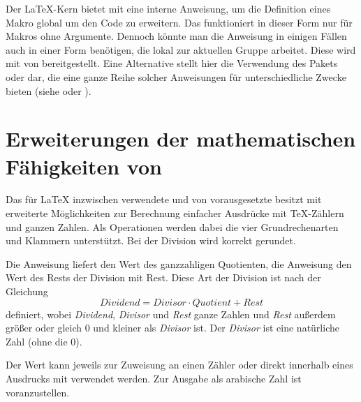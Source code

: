\begin{Declaration}
\end{Declaration}%
Der \LaTeX-Kern bietet mit  eine interne Anweisung, um
die Definition eines Makro  global um den Code
 zu erweitern. Das funktioniert in dieser Form nur für
Makros ohne Argumente. Dennoch könnte man die Anweisung in einigen Fällen
auch in einer Form benötigen, die lokal zur aktuellen Gruppe arbeitet. Diese
wird mit  von  bereitgestellt. Eine
Alternative stellt hier die Verwendung des Pakets
 oder
 dar, die eine ganze Reihe solcher
Anweisungen für unterschiedliche Zwecke bieten (siehe
\cite{package:etoolbox} oder \cite{package:xpatch}).
%
\EndIndexGroup


\section{Erweiterungen der mathematischen Fähigkeiten von \eTeX}

Das für \LaTeX{} inzwischen verwendete und von \KOMAScript{} vorausgesetzte
\eTeX{} besitzt mit  erweiterte Möglichkeiten
zur Berechnung einfacher Ausdrücke mit \TeX-Zählern und ganzen Zahlen. Als
Operationen werden dabei die vier Grundrechenarten und Klammern
unterstützt. Bei der Division wird korrekt gerundet.
\iffalse Manchmal sind weitere Operationen nützlich.\fi%

\begin{Declaration}
\end{Declaration}%
%
%
Die Anweisung  liefert den
Wert des ganzzahligen Quotienten, die Anweisung  den Wert des
Rests der Division mit Rest. Diese Art der Division ist nach der Gleichung
\[
\textit{Dividend} = \textit{Divisor} \cdot
\textit{Quotient} + \textit{Rest}
\]
%
definiert, wobei \textit{Dividend}, \textit{Divisor} und \textit{Rest} ganze
Zahlen und \textit{Rest} außerdem größer oder gleich 0 und kleiner als
\textit{Divisor} ist. Der \textit{Divisor} ist eine natürliche Zahl (ohne die
0).

Der Wert kann jeweils zur Zuweisung an einen Zähler oder direkt innerhalb
eines Ausdrucks mit  verwendet werden. Zur
Ausgabe als arabische Zahl ist  voranzustellen.%
%
\EndIndexGroup


